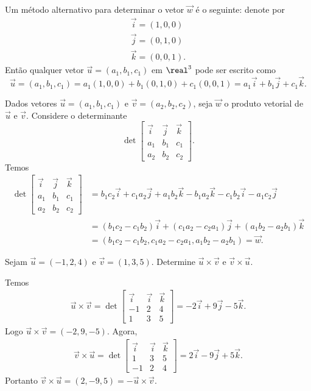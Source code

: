 Um m\'etodo alternativo para determinar o vetor $\vec{w}$ \'e o seguinte: denote por
\begin{align*}
  \vec{i} = (1,0,0)\\
  \vec{j} = (0,1,0)\\
  \vec{k} = (0,0,1).
\end{align*}
Ent\~ao qualquer vetor $\vec{u} = (a_1,b_1,c_1)$ em $\real^3$ pode ser escrito como
\[
  \vec{u} = (a_1,b_1,c_1) = a_1(1,0,0) + b_1(0,1,0) + c_1(0,0,1) = a_1\vec{i} + b_1\vec{j} + c_1\vec{k}.
\]

Dados vetores $\vec{u} = (a_1,b_1,c_1)$ e $\vec{v} = (a_2,b_2,c_2)$, seja $\vec{w}$ o produto vetorial de $\vec{u}$ e $\vec{v}$. Considere o determinante
\[
  \det \begin{bmatrix}
    \vec{i} & \vec{j} & \vec{k}\\
    a_1 & b_1 & c_1\\
    a_2 & b_2 & c_2
  \end{bmatrix}.
\]
Temos
\begin{align*}
  \det \begin{bmatrix}
    \vec{i} & \vec{j} & \vec{k}\\
    a_1 & b_1 & c_1\\
    a_2 & b_2 & c_2
  \end{bmatrix} &= b_1c_2\vec{i} + c_1a_2\vec{j} + a_1b_2\vec{k} - b_1a_2\vec{k} - c_1b_2\vec{i} - a_1c_2\vec{j}\\ &= (b_1c_2 - c_1b_2)\vec{i} + (c_1a_2 - c_2a_1)\vec{j} + (a_1b_2 - a_2b_1)\vec{k} \\ &= (b_1c_2 - c_1b_2, c_1a_2 - c_2a_1, a_1b_2 - a_2b_1) = \vec{w}.
\end{align*}

\begin{exemplo}
  Sejam $\vec{u} = (-1,2,4)$ e $\vec{v} = (1,3,5)$. Determine $\vec{u}\times\vec{v}$ e $\vec{v}\times\vec{u}$.
  \begin{solucao}
    Temos
    \begin{align*}
      \vec{u}\times\vec{v} = \det \begin{bmatrix}
        \vec{i} & \vec{i} & \vec{k}\\
        -1 & 2 & 4\\
        1 & 3 & 5
      \end{bmatrix} = -2\vec{i} + 9\vec{j} - 5\vec{k}.
    \end{align*}
    Logo $\vec{u}\times\vec{v} = (-2,9,-5)$.
    Agora,
    \begin{align*}
      \vec{v}\times\vec{u} = \det \begin{bmatrix}
        \vec{i} & \vec{i} & \vec{k}\\
        1 & 3 & 5\\
        -1 & 2 & 4
      \end{bmatrix} = 2\vec{i} - 9\vec{j} + 5\vec{k}.
    \end{align*}
    Portanto $\vec{v}\times\vec{u} = (2,-9,5) = -\vec{u}\times\vec{v}$.
  \end{solucao}
\end{exemplo}


